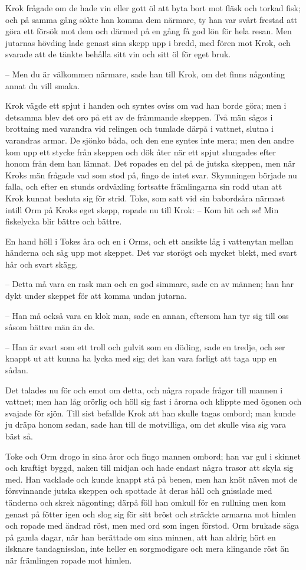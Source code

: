 \initial Krok frågade om de hade vin eller gott öl att byta bort mot fläsk och torkad fisk; och på samma gång sökte han komma dem närmare, ty han var svårt frestad att göra ett försök mot dem och därmed på en gång få god lön för hela resan. Men jutarnas hövding lade genast sina skepp upp i bredd, med fören mot Krok, och svarade att de tänkte behålla sitt vin och sitt öl för eget bruk.

– Men du är välkommen närmare, sade han till Krok, om det finns någonting annat du vill smaka.

\initial Krok vägde ett spjut i handen och syntes oviss om vad han borde göra; men i detsamma blev det oro på ett av de främmande skeppen. Två män sågos i brottning med varandra vid relingen och tumlade därpå i vattnet, slutna i varandras armar. De sjönko båda, och den ene syntes inte mera; men den andre kom upp ett stycke från skeppen och dök åter när ett spjut slungades efter honom från dem han lämnat. Det ropades en del på de jutska skeppen, men när Kroks män frågade vad som stod på, fingo de intet svar. Skymningen började nu falla, och efter en stunds ordväxling fortsatte främlingarna sin rodd utan att Krok kunnat besluta sig för strid. Toke, som satt vid sin babordsåra närmast intill Orm på Kroks eget skepp, ropade nu till Krok:
– Kom hit och se! Min fiskelycka blir bättre och bättre.

\initial En hand höll i Tokes åra och en i Orms, och ett ansikte låg i vattenytan mellan händerna och såg upp mot skeppet. Det var storögt och mycket blekt, med svart hår och svart skägg.

– Detta må vara en rask man och en god simmare, sade en av männen; han har dykt under skeppet för att komma undan jutarna.

– Han må också vara en klok man, sade en annan, eftersom han tyr sig till oss såsom bättre män än de.

– Han är svart som ett troll och gulvit som en döding, sade en tredje, och ser knappt ut att kunna ha lycka med sig; det kan vara farligt att taga upp en sådan.

\initial Det talades nu för och emot om detta, och några ropade frågor till mannen i vattnet; men han låg orörlig och höll sig fast i årorna och klippte med ögonen och svajade för sjön. Till sist befallde Krok att han skulle tagas ombord; man kunde ju dräpa honom sedan, sade han till de motvilliga, om det skulle visa sig vara bäst så.

\initial Toke och Orm drogo in sina åror och fingo mannen ombord; han var gul i skinnet och kraftigt byggd, naken till midjan och hade endast några trasor att skyla sig med. Han vacklade och kunde knappt stå på benen, men han knöt näven mot de försvinnande jutska skeppen och spottade åt deras håll och gnisslade med tänderna och skrek någonting; därpå föll han omkull för en rullning men kom genast på fötter igen och slog sig för sitt bröst och sträckte armarna mot himlen och ropade med ändrad röst, men med ord som ingen förstod. Orm brukade säga på gamla dagar, när han berättade om sina minnen, att han aldrig hört en ilsknare tandagnisslan, inte heller en sorgmodigare och mera klingande röst än när främlingen ropade mot himlen.

